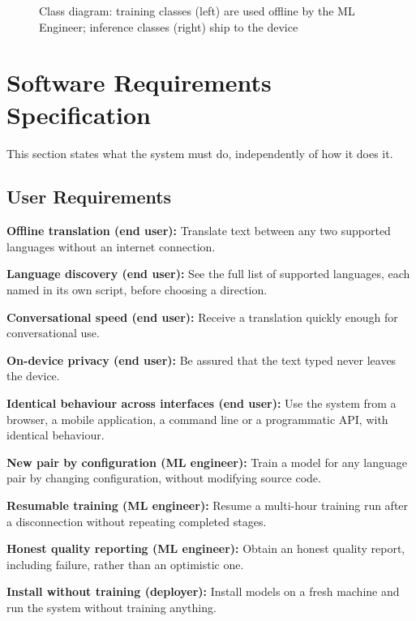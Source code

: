 \begin{figure}[H]
{}
\caption{Class diagram: training classes (left) are used offline by the ML Engineer; inference classes (right) ship to the device}
\label{fig:class}
\end{figure}

\section{Software Requirements Specification}
\label{sec:srs}

This section states what the system must do, independently of how it does it.

\subsection{User Requirements}
\label{subsec:userreq}

\begin{bullets}
\item \textbf{Offline translation (end user):} Translate text between any two supported languages without an internet connection.
\item \textbf{Language discovery (end user):} See the full list of supported languages, each named in its own script, before choosing a direction.
\item \textbf{Conversational speed (end user):} Receive a translation quickly enough for conversational use.
\item \textbf{On-device privacy (end user):} Be assured that the text typed never leaves the device.
\item \textbf{Identical behaviour across interfaces (end user):} Use the system from a browser, a mobile application, a command line or a programmatic API, with identical behaviour.
\item \textbf{New pair by configuration (ML engineer):} Train a model for any language pair by changing configuration, without modifying source code.
\item \textbf{Resumable training (ML engineer):} Resume a multi-hour training run after a disconnection without repeating completed stages.
\item \textbf{Honest quality reporting (ML engineer):} Obtain an honest quality report, including failure, rather than an optimistic one.
\item \textbf{Install without training (deployer):} Install models on a fresh machine and run the system without training anything.
\end{bullets}

